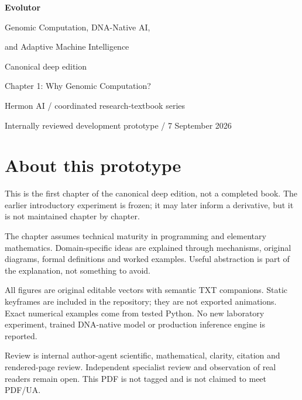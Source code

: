 \documentclass[11pt,oneside,openany]{book}
\begin{document}
\frontmatter
\begin{titlepage}
\color{BookBlue}\sffamily
\vspace*{18mm}
{\Huge\bfseries Evolutor\par}
\vspace{8mm}
{\Large Genomic Computation, DNA-Native AI,\par and Adaptive Machine Intelligence\par}
\vspace{20mm}
{\large Canonical deep edition\par}
\vspace{5mm}
{\LARGE Chapter 1: Why Genomic Computation?\par}
\vfill
{\normalsize Hermon AI / coordinated research-textbook series\par}
\vspace{6mm}
{\small Internally reviewed development prototype / 7 September 2026\par}
\end{titlepage}
\chapter*{About this prototype}
This is the first chapter of the canonical deep edition, not a completed book. The earlier introductory experiment is frozen; it may later inform a derivative, but it is not maintained chapter by chapter.

The chapter assumes technical maturity in programming and elementary mathematics. Domain-specific ideas are explained through mechanisms, original diagrams, formal definitions and worked examples. Useful abstraction is part of the explanation, not something to avoid.

All figures are original editable vectors with semantic TXT companions. Static keyframes are included in the repository; they are not exported animations. Exact numerical examples come from tested Python. No new laboratory experiment, trained DNA-native model or production inference engine is reported.

Review is internal author-agent scientific, mathematical, clarity, citation and rendered-page review. Independent specialist review and observation of real readers remain open. This PDF is not tagged and is not claimed to meet PDF/UA.
\tableofcontents
\mainmatter

\backmatter


\clearpage{}
{}
\printindex
\end{document}

